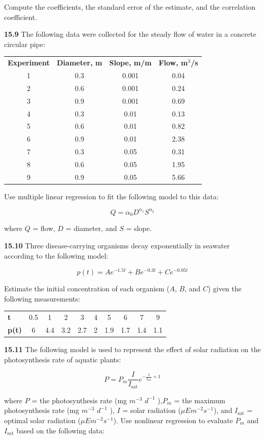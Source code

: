 \documentclass[../main.tex]{subfiles}
\begin{document}
\begin{multicols}{2}
	\noindent Compute the coefficients, the standard error of the estimate,
	and the correlation coefficient.

	\noindent\textbf{15.9} The following data were collected for the steady flow of water in a concrete circular pipe:

	\noindent
	\begin{tabular}{c c c c}
		\textbf{Experiment} & \textbf{Diameter, m} & \textbf{Slope, m/m} & \textbf{Flow, m$^3$/s} \\
		1 & 0.3 & 0.001 & 0.04 \\
		2 & 0.6 & 0.001 & 0.24 \\
		3 & 0.9 & 0.001 & 0.69 \\
		4 & 0.3 & 0.01 & 0.13  \\
		5 & 0.6 & 0.01 & 0.82 \\
		6 & 0.9 & 0.01 & 2.38 \\
		7 & 0.3 & 0.05 & 0.31 \\
		8 & 0.6 & 0.05 & 1.95 \\
		9 & 0.9 & 0.05 & 5.66
	\end{tabular}

	\noindent Use multiple linear regression to fit the following model to this data:

	$$
		Q = \alpha_0 D^{\alpha_1} S^{\alpha_2}
	$$

	\noindent where $Q$ = flow, $D$ = diameter, and $S$ = slope.

	\noindent\textbf{15.10} Three disease-carrying organisms decay exponentially in seawater according to the following model:

	$$
		p(t) = Ae^{-1.5t} + Be^{-0.3t} + Ce^{-0.05t}
	$$

	\noindent Estimate the initial concentration of each organism ($A$, $B$,
	and $C$) given the following measurements:

	\noindent
	\begin{tabular}{l c c c c c c c c c}
		\textbf{t} & 0.5 & 1 & 2 & 3 & 4 & 5 & 6 & 7 & 9 \\
		\textbf{p(t)} & 6 & 4.4 & 3.2 & 2.7 & 2 & 1.9 & 1.7 & 1.4 & 1.1
	\end{tabular}

	\noindent\textbf{15.11} The following model is used to represent the effect of
	solar radiation on the photosynthesis rate of aquatic plants:

	$$
		P = P_m \frac{I}{I_{\text{sat}}} e ^ {-\frac{I}{I_{\text{sat}}} + 1}
	$$

	\noindent where $P$ = the photosynthesis rate (mg $m^{-3}$ $d^{-1}$ ),$P_m$ = the
	maximum photosynthesis rate (mg $m^{-3}$ $d^{-1}$ ), $I$ = solar
	radiation ($\mu E m^{-2} s^{-1}$), and $I_{\text{sat}}$ = optimal solar radiation
	($\mu E m^{-2} s^{-1}$). Use nonlinear regression to evaluate $P_m$ and
	$I_{\text{sat}}$ based on the following data:


\end{multicols}
\end{document}

